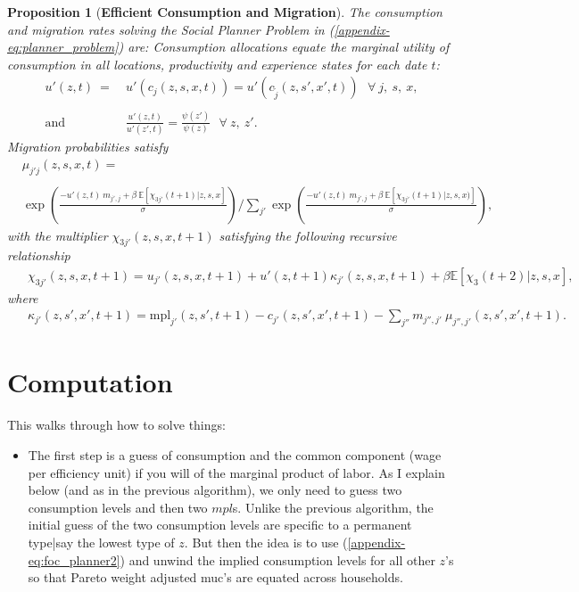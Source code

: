 \documentclass[12pt,pdftex]{article}
\newtheorem{proposition}{Proposition}
\begin{document}
\begin{onehalfspacing}
\begin{proposition}[\textbf{Efficient Consumption and Migration}] \label{apx-prp:efficient} The consumption and migration rates solving the Social Planner Problem in (\ref{appendix-eq:planner_problem}) are: Consumption allocations equate the marginal utility of consumption in all locations, productivity and experience states for each date $t$:
{\small
\begin{align}
u'(z, t) \ = \ & u'(c_{j}(z, s, x, t)) = u'(c_{\tilde{j}}(z, s', x', t)) \ \ \ \forall \ j, \ s, \ x, \\
\label{appendix-eq:foc_planner2}
\nonumber \\
\mbox{and} \ \ \ \ \ \ &\frac{u'(z, t)}{u'(z',t)} = \frac{\psi(z')}{\psi(z)} \ \ \ \forall \ z, \ z'.
\end{align}
}
Migration probabilities satisfy
{\footnotesize
\begin{align}
& \mu_{j'j}(z,s,x,t)  = \nonumber \\
\nonumber \\
& \exp \left(\frac{- u'(z,t) \ m_{j',j} + \beta \ \mathbb{E}\left[\chi_{3j'}(t+1)| z,s,x\right]}{\sigma} \right)  \Bigg / \sum_{j'} \exp \left( \frac{- u'(z, t)\ m_{j',j} + \beta \  \mathbb{E}\left[\chi_{3j'}(t+1)|z,s,x ) \right]}{\sigma} \right), \label{appendix-eq:migration_prob}
\end{align}
}
with the multiplier $\chi_{3j'}(z, s, x, t+1)$ satisfying the following recursive relationship
{\small
\begin{align}
& \ \ \chi_{3j'}(z, s, x, t+1) =  u_{j'}(z, s, x, t+1) +  u'(z, t+1) \kappa_{j'}(z, s,x,t+1) + \beta \mathbb{E}\left[\chi_{3}(t+2)|z, s, x  \right], \label{appendix-eq:dynamic_multiplier}
\end{align}}
where
{\small
\begin{align}
& \ \ \kappa_{j'}(z, s',x',t+1) = \mbox{mpl}_{j'}(z,s',t+1) - c_{j'}(z, s',x',t+1) - \sum_{j''}  m_{j'',j'} \ \mu_{j'',j'}(z, s', x', t+1). \label{appendix-eq:kappa}
\end{align}}
\end{proposition}

\section{Computation}

This walks through how to solve things:
\begin{itemize}
\item The first step is a guess of consumption and the common component (wage per efficiency unit) if you will of the marginal product of labor. As I explain below (and as in the previous algorithm), we only need to guess two consumption levels and then two $mpl$s. Unlike the previous algorithm, the initial guess of the two consumption levels are specific to a permanent type|say the lowest type of $z$. But then the idea is to use (\ref{appendix-eq:foc_planner2}) and unwind the implied consumption levels for all other $z$'s so that Pareto weight adjusted muc's are equated across households.


\end{itemize}
\end{onehalfspacing}
\end{document}
